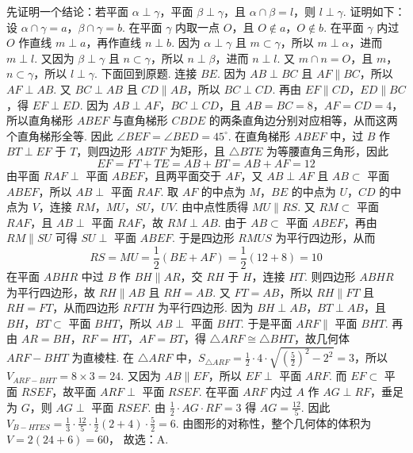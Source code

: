 \documentclass[UTF8,a4paper,oneside,11pt]{ctexbook}
\begin{document}
\begin{solution}
先证明一个结论：若平面 \(\alpha\perp\gamma\)，平面 \(\beta\perp\gamma\)，且 \(\alpha\cap\beta=l\)，则 \(l\perp\gamma\). 证明如下：设 \(\alpha\cap\gamma=a\)，\(\beta\cap\gamma=b\). 在平面 \(\gamma\) 内取一点 \(O\)，且 \(O\notin a\)，\(O\notin b\). 在平面 \(\gamma\) 内过 \(O\) 作直线 \(m\perp a\)，再作直线 \(n\perp b\). 因为 \(\alpha\perp\gamma\) 且 \(m\subset\gamma\)，所以 \(m\perp\alpha\)，进而 \(m\perp l\). 又因为 \(\beta\perp\gamma\) 且 \(n\subset\gamma\)，所以 \(n\perp\beta\)，进而 \(n\perp l\). 又 \(m\cap n=O\)，且 \(m\)，\(n\subset\gamma\)，所以 \(l\perp\gamma\). 下面回到原题. 连接 \(BE\). 因为 \(AB\perp BC\) 且 \(AF\parallel BC\)，所以 \(AF\perp AB\). 又 \(BC\perp AB\) 且 \(CD\parallel AB\)，所以 \(BC\perp CD\). 再由 \(EF\parallel CD\)，\(ED\parallel BC\)，得 \(EF\perp ED\). 因为 \(AB\perp AF\)，\(BC\perp CD\)，且 \(AB=BC=8\)，\(AF=CD=4\)，所以直角梯形 \(ABEF\) 与直角梯形 \(CBDE\) 的两条直角边分别对应相等，从而这两个直角梯形全等. 因此 \(\angle BEF=\angle BED=45^\circ\). 在直角梯形 \(ABEF\) 中，过 \(B\) 作 \(BT\perp EF\) 于 \(T\)，则四边形 \(ABTF\) 为矩形，且 \(\triangle BTE\) 为等腰直角三角形，因此
\[EF=FT+TE=AB+BT=AB+AF=12\]
由平面 \(RAF\perp\) 平面 \(ABEF\)，且两平面交于 \(AF\)，又 \(AB\perp AF\) 且 \(AB\subset\) 平面 \(ABEF\)，所以 \(AB\perp\) 平面 \(RAF\). 取 \(AF\) 的中点为 \(M\)，\(BE\) 的中点为 \(U\)，\(CD\) 的中点为 \(V\)，连接 \(RM\)，\(MU\)，\(SU\)，\(UV\). 由中点性质得 \(MU\parallel RS\). 又 \(RM\subset\) 平面 \(RAF\)，且 \(AB\perp\) 平面 \(RAF\)，故 \(RM\perp AB\). 由于 \(AB\subset\) 平面 \(ABEF\)，再由 \(RM\parallel SU\) 可得 \(SU\perp\) 平面 \(ABEF\). 于是四边形 \(RMUS\) 为平行四边形，从而
\[
RS=MU=\frac12\left( BE+AF \right)=\frac12\left( 12+8 \right)=10
\]
在平面 \(ABHR\) 中过 \(B\) 作 \(BH\parallel AR\)，交 \(RH\) 于 \(H\)，连接 \(HT\). 则四边形 \(ABHR\) 为平行四边形，故 \(RH\parallel AB\) 且 \(RH=AB\). 又 \(FT=AB\)，所以 \(RH\parallel FT\) 且 \(RH=FT\)，从而四边形 \(RFTH\) 为平行四边形. 因为 \(BH\perp AB\)，\(BT\perp AB\)，且 \(BH\)，\(BT\subset\) 平面 \(BHT\)，所以 \(AB\perp\) 平面 \(BHT\). 于是平面 \(ARF\parallel\) 平面 \(BHT\). 再由 \(AR=BH\)，\(RF=HT\)，\(AF=BT\)，得 \(\triangle ARF\cong\triangle BHT\)，故几何体 \(ARF-BHT\) 为直棱柱. 在 \(\triangle ARF\) 中，\(S_{\triangle ARF}=\frac12\cdot 4\cdot \sqrt{\left(\frac52\right)^2-2^2}=3\)，所以 \(V_{ARF-BHT}=8\times 3=24\). 又因为 \(AB\parallel EF\)，所以 \(EF\perp\) 平面 \(ARF\). 而 \(EF\subset\) 平面 \(RSEF\)，故平面 \(ARF\perp\) 平面 \(RSEF\). 在平面 \(ARF\) 内过 \(A\) 作 \(AG\perp RF\)，垂足为 \(G\)，则 \(AG\perp\) 平面 \(RSEF\). 由 \(\frac12\cdot AG\cdot RF=3\) 得 \(AG=\frac{12}{5}\). 因此 \(V_{B-HTES}=\frac13\cdot \frac{12}{5}\cdot \frac12(2+4)\cdot \frac52=6\). 由图形的对称性，整个几何体的体积为
\(
V=2(24+6)=60
\)，
故选：A.
\end{solution}
\end{document}
